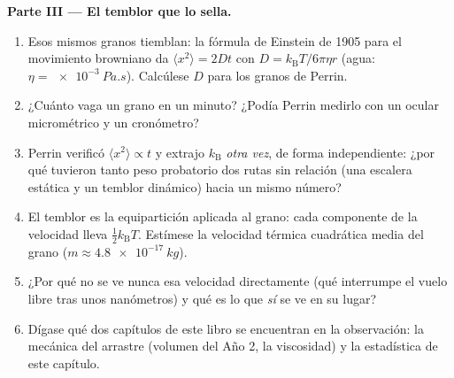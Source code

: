 \begin{problem}
\medskip\noindent\textbf{Parte III --- El temblor que lo sella.}
\begin{enumerate}[resume]
  \item Esos mismos granos tiemblan: la fórmula de Einstein de 1905 para
        el movimiento browniano da $\langle x^2\rangle = 2Dt$ con $D =
        k_{\text{B}}T/6\pi\eta r$ (agua: $\eta =
        \qty{e-3}{Pa.s}$). Calcúlese $D$ para los granos de Perrin.
  \item ¿Cuánto vaga un grano en un minuto? ¿Podía Perrin
        medirlo con un ocular micrométrico y un cronómetro?
  \item Perrin verificó $\langle x^2\rangle \propto t$ y
        extrajo $k_{\text{B}}$ \emph{otra vez}, de forma independiente:
        ¿por qué tuvieron tanto peso probatorio dos rutas sin relación
        (una escalera estática y un temblor dinámico) hacia un mismo
        número?
  \item El temblor es la equipartición aplicada al grano: cada
        componente de la velocidad lleva $\tfrac12 k_{\text{B}}T$.
        Estímese la velocidad térmica cuadrática media del grano ($m \approx
        \qty{4.8e-17}{kg}$).
  \item ¿Por qué no se ve nunca esa velocidad directamente (qué
        interrumpe el vuelo libre tras unos nanómetros) y qué es lo que
        \emph{sí} se ve en su lugar?
  \item Dígase qué dos capítulos de este libro se encuentran en la
        observación: la mecánica del arrastre (volumen del Año 2, la
        viscosidad) y la estadística de este capítulo.
\end{enumerate}


\end{problem}
